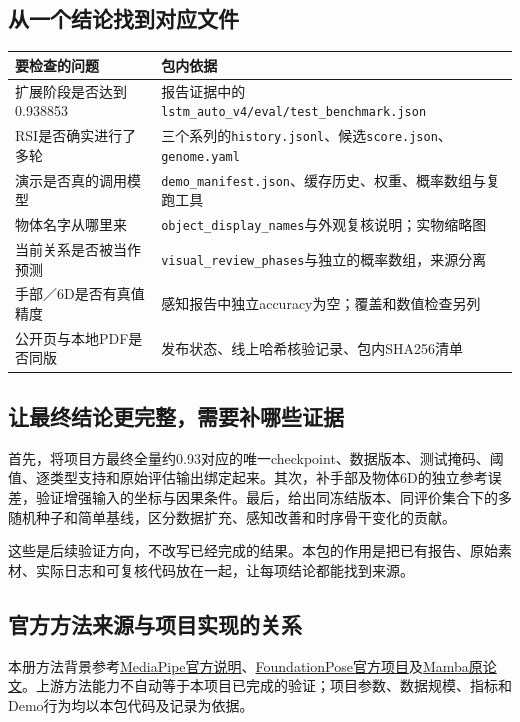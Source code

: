 \documentclass[11pt,a4paper,UTF8,fontset=fandol]{ctexart}
\newcommand{\code}[1]{{\small\nolinkurl{#1}}}
\begin{document}
\subsection{从一个结论找到对应文件}
\begin{tabularx}{\linewidth}{p{4cm}X}
\toprule 要检查的问题 & 包内依据\\\midrule
扩展阶段是否达到0.938853 & 报告证据中的\code{lstm_auto_v4/eval/test_benchmark.json}\\
RSI是否确实进行了多轮 & 三个系列的\code{history.jsonl}、候选\code{score.json}、\code{genome.yaml}\\
演示是否真的调用模型 & \code{demo_manifest.json}、缓存历史、权重、概率数组与复跑工具\\
物体名字从哪里来 & \code{object_display_names}与外观复核说明；实物缩略图\\
当前关系是否被当作预测 & \code{visual_review_phases}与独立的概率数组，来源分离\\
手部／6D是否有真值精度 & 感知报告中独立accuracy为空；覆盖和数值检查另列\\
公开页与本地PDF是否同版 & 发布状态、线上哈希核验记录、包内SHA256清单\\\bottomrule
\end{tabularx}

\subsection{让最终结论更完整，需要补哪些证据}
首先，将项目方最终全量约0.93对应的唯一checkpoint、数据版本、测试掩码、阈值、逐类型支持和原始评估输出绑定起来。其次，补手部及物体6D的独立参考误差，验证增强输入的坐标与因果条件。最后，给出同冻结版本、同评价集合下的多随机种子和简单基线，区分数据扩充、感知改善和时序骨干变化的贡献。

这些是后续验证方向，不改写已经完成的结果。本包的作用是把已有报告、原始素材、实际日志和可复核代码放在一起，让每项结论都能找到来源。

\subsection{官方方法来源与项目实现的关系}
本册方法背景参考\href{https://developers.google.com/edge/mediapipe/solutions/vision/hand_landmarker}{MediaPipe官方说明}、\href{https://nvlabs.github.io/FoundationPose/}{FoundationPose官方项目}及\href{https://arxiv.org/abs/2312.00752}{Mamba原论文}。上游方法能力不自动等于本项目已完成的验证；项目参数、数据规模、指标和Demo行为均以本包代码及记录为依据。
\end{document}
